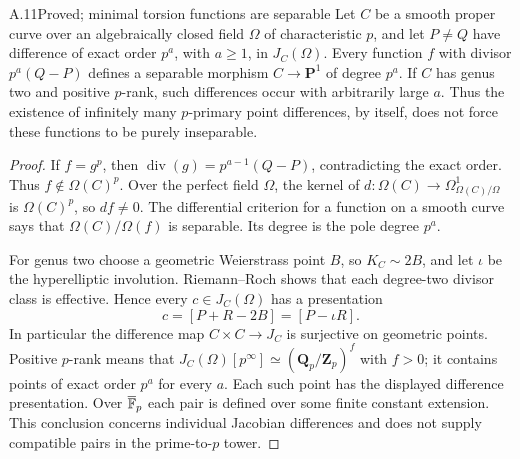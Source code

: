\begin{claim}{A.11}{Proved; minimal torsion functions are separable}
Let $C$ be a smooth proper curve over an algebraically closed field
$\Omega$ of characteristic $p$, and let $P\ne Q$ have difference
of exact order $p^a$, with $a\ge1$, in $J_C(\Omega)$.
Every function $f$ with divisor $p^a(Q-P)$ defines a separable
morphism $C\to\mathbf P^1$ of degree $p^a$.
If $C$ has genus two and positive $p$-rank, such differences
occur with arbitrarily large $a$. Thus the existence of
infinitely many $p$-primary point differences, by itself, does
not force these functions to be purely inseparable.
\end{claim}
\begin{proof}
If $f=g^p$, then
$\operatorname{div}(g)=p^{a-1}(Q-P)$, contradicting the
exact order. Thus $f\notin\Omega(C)^p$. Over the perfect
field $\Omega$, the kernel of
$d:\Omega(C)\to\Omega^1_{\Omega(C)/\Omega}$ is
$\Omega(C)^p$, so $df\ne0$. The differential criterion for
a function on a smooth curve says that
$\Omega(C)/\Omega(f)$ is separable. Its degree is the pole
degree $p^a$.

For genus two choose a geometric Weierstrass point $B$, so
$K_C\sim2B$, and let $\iota$ be the hyperelliptic involution.
Riemann--Roch shows that each degree-two divisor class is
effective. Hence every $c\in J_C(\Omega)$ has a presentation
\[
 c=[P+R-2B]=[P-\iota R].
\]
In particular the difference map $C\times C\to J_C$ is
surjective on geometric points. Positive $p$-rank means that
$J_C(\Omega)[p^\infty]\simeq(\mathbf Q_p/\mathbf Z_p)^f$
with $f>0$; it contains points of exact order $p^a$ for every
$a$. Each such point has the displayed difference presentation.
Over $\overline{\mathbb F}_p$ each pair is defined over some finite
constant extension. This conclusion concerns individual
Jacobian differences and does not supply compatible pairs in
the prime-to-$p$ tower.
\end{proof}


